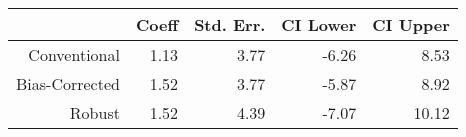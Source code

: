 \begin{tabular}{rrrrr}
  \hline
 & Coeff & Std. Err. & CI Lower & CI Upper \\ 
  \hline
Conventional & 1.13 & 3.77 & -6.26 & 8.53 \\ 
  Bias-Corrected & 1.52 & 3.77 & -5.87 & 8.92 \\ 
  Robust & 1.52 & 4.39 & -7.07 & 10.12 \\ 
   \hline
\end{tabular}
